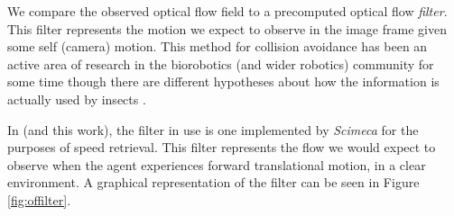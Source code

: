 \documentclass[a4paper,11pt,twoside,openright]{article}
\begin{document}
We compare the observed optical flow field to a precomputed optical flow
\textit{filter}. This filter represents the motion we expect to observe in the
image frame given some self (camera) motion. This method for collision
avoidance has been an active area of research in the biorobotics (and
wider robotics) community for some time though there are different
hypotheses about how the information is actually used by insects
\cite{Julien2017}.\newline\par

In \cite{Mitchell2018} (and this work), the filter in use is one
implemented by \textit{Scimeca} for the purposes of speed
retrieval. This filter represents the flow we would expect to observe
when the agent experiences forward translational motion, in a clear
environment. A graphical representation of the filter can be seen in
Figure \ref{fig:offilter}.
\newline\par
\end{document}
